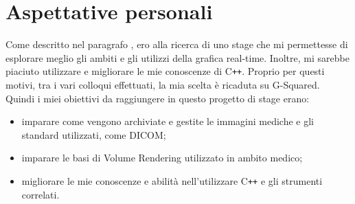 \section{Aspettative personali}
Come descritto nel paragrafo , ero alla ricerca di uno stage che mi permettesse di esplorare meglio gli ambiti e gli utilizzi della grafica real-time. Inoltre, mi sarebbe piaciuto utilizzare e migliorare le mie conoscenze di C\texttt{++}. Proprio per questi motivi, tra i vari colloqui effettuati, la mia scelta è ricaduta su G-Squared. Quindi i miei obiettivi da raggiungere in questo progetto di stage erano:
\begin{itemize}
\item imparare come vengono archiviate e gestite le immagini mediche e gli standard utilizzati, come DICOM;
\item imparare le basi di Volume Rendering utilizzato in ambito medico;
\item migliorare le mie conoscenze e abilità nell'utilizzare C\texttt{++} e gli strumenti correlati.
\end{itemize}